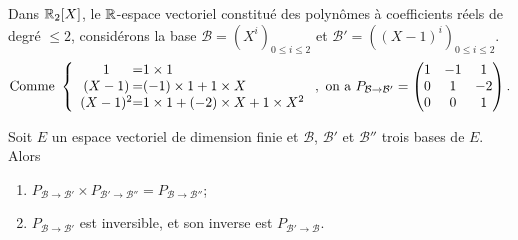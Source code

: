 \documentclass{book}
\begin{document}
  \begin{Exemple}
Dans $\mathbb{R} _2[X]$, le $\mathbb{R} $-espace vectoriel constitué des polynômes à coefficients réels de degré $\leq 2$, considérons la base $\mathcal{B}=(X^i)_{0\leq i \leq 2}$ et  $\mathcal{B}'=((X-1)^i)_{0\leq i \leq 2}$.
\[\text{Comme }
\left \{
\begin{array}{c @{=} l}
   1 & 1\times 1 \\
  (X-1) & (-1)\times 1 + 1\times X \\
  (X-1)^2 & 1\times 1 + (-2)\times X + 1\times X^2
\end{array}
\right. , \text{ on a }P_{\mathcal{B}\to\mathcal{B}'}=\begin{pmatrix}
1&-1&1\\0&1&-2\\0&0&1
\end{pmatrix}.
\]
 \end{Exemple}
\begin{Proposition}
Soit $E$ un espace vectoriel de dimension finie et $\mathcal{B}$, $\mathcal{B}'$ et $\mathcal{B}''$ trois bases de $E$.
Alors
\begin{enumerate}
\item
  $P_{\mathcal{B} \to \mathcal{B}'} × P_{\mathcal{B}' \to \mathcal{B}''} = P_{\mathcal{B} \to \mathcal{B}''}$;
\item
  $P_{\mathcal{B} \to \mathcal{B}'}$ est inversible, et son inverse est $P_{\mathcal{B}' \to \mathcal{B}}$.
\end{enumerate}
\end{Proposition}
\end{document}
